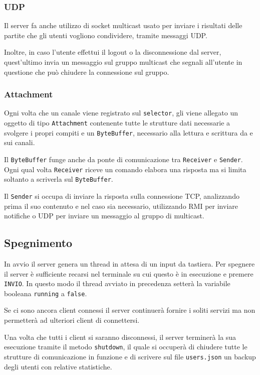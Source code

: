 \subsubsection{UDP}
Il server fa anche utilizzo di socket multicast usato per inviare i risultati delle partite che
gli utenti vogliono condividere, tramite messaggi UDP.

Inoltre, in caso l'utente effettui il logout o la disconnessione dal server, quest'ultimo invia
un messaggio sul gruppo multicast che segnali all'utente in questione che può chiudere la
connessione sul gruppo.

\subsubsection{Attachment}
Ogni volta che un canale viene registrato sul \verb|selector|, gli viene allegato un oggetto di
tipo \verb|Attachment| contenente tutte le strutture dati necessarie a svolgere i propri compiti
e un \verb|ByteBuffer|, necessario alla lettura e scrittura da e sui canali.

Il \verb|ByteBuffer| funge anche da ponte di comunicazione tra \verb|Receiver| e
\verb|Sender|. Ogni qual volta \verb|Receiver| riceve un comando elabora una risposta ma si limita
soltanto a scriverla sul \verb|ByteBuffer|.

Il \verb|Sender| si occupa di inviare la risposta sulla connessione TCP, analizzando prima il suo
contenuto e nel caso sia necessario, utilizzando RMI per inviare notifiche o UDP per inviare un
messaggio al gruppo di multicast.

\subsection{Spegnimento}
In avvio il server genera un thread in attesa di un input da tastiera. Per spegnere il server è
sufficiente recarsi nel terminale su cui questo è in esecuzione e premere \verb|INVIO|. In questo
modo il thread avviato in precedenza setterà la variabile booleana \verb|running| a \verb|false|.

Se ci sono ancora client connessi il server continuerà fornire i soliti servizi ma non permetterà
ad ulteriori client di connettersi.

Una volta che tutti i client si saranno disconnessi, il server terminerà la sua esecuzione tramite
il metodo \verb|shutdown|, il quale si occuperà di chiudere tutte le strutture di comunicazione
in funzione e di scrivere sul file \verb|users.json| un backup degli utenti con relative
statistiche.